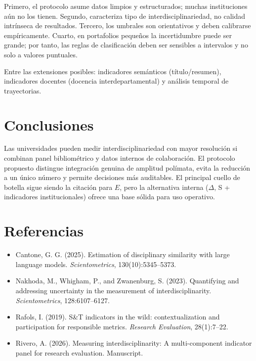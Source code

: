 \documentclass[
]{article}
\providecommand{\tightlist}{%
  \setlength{\itemsep}{0pt}\setlength{\parskip}{0pt}}
\begin{document}
Primero, el protocolo asume datos limpios y estructurados; muchas
instituciones aún no los tienen. Segundo, caracteriza tipo de
interdisciplinariedad, no calidad intrínseca de resultados. Tercero, los
umbrales son orientativos y deben calibrarse empíricamente. Cuarto, en
portafolios pequeños la incertidumbre puede ser grande; por tanto, las
reglas de clasificación deben ser sensibles a intervalos y no solo a
valores puntuales.

Entre las extensiones posibles: indicadores semánticos (título/resumen),
indicadores docentes (docencia interdepartamental) y análisis temporal
de trayectorias.

\hypertarget{conclusiones}{%
\section{Conclusiones}\label{conclusiones}}

Las universidades pueden medir interdisciplinariedad con mayor
resolución si combinan panel bibliométrico y datos internos de
colaboración. El protocolo propuesto distingue integración genuina de
amplitud polímata, evita la reducción a un único número y permite
decisiones más auditables. El principal cuello de botella sigue siendo
la citación para \(E\), pero la alternativa interna (\(\Delta\), S +
indicadores institucionales) ofrece una base sólida para uso operativo.

\hypertarget{referencias}{%
\section{Referencias}\label{referencias}}

\begin{itemize}
\tightlist
\item
  Cantone, G. G. (2025). Estimation of disciplinary similarity with
  large language models. \emph{Scientometrics}, 130(10):5345--5373.
\item
  Nakhoda, M., Whigham, P., and Zwanenburg, S. (2023). Quantifying and
  addressing uncertainty in the measurement of interdisciplinarity.
  \emph{Scientometrics}, 128:6107--6127.
\item
  Rafols, I. (2019). S\&T indicators in the wild: contextualization and
  participation for responsible metrics. \emph{Research Evaluation},
  28(1):7--22.
\item
  Rivero, A. (2026). Measuring interdisciplinarity: A multi-component
  indicator panel for research evaluation. Manuscript.
\end{itemize}
\end{document}
